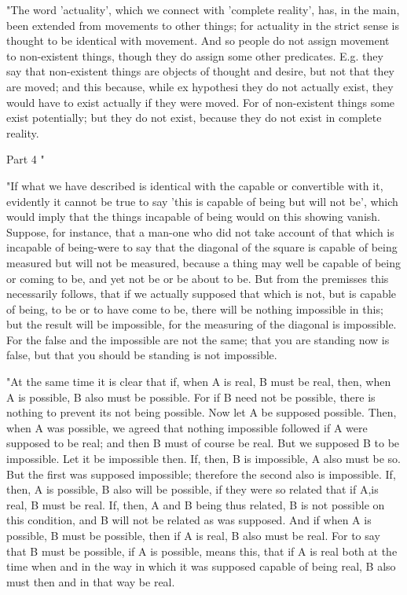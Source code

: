 "The word 'actuality', which we connect with 'complete reality', has,
in the main, been extended from movements to other things; for actuality
in the strict sense is thought to be identical with movement. And
so people do not assign movement to non-existent things, though they
do assign some other predicates. E.g. they say that non-existent things
are objects of thought and desire, but not that they are moved; and
this because, while ex hypothesi they do not actually exist, they
would have to exist actually if they were moved. For of non-existent
things some exist potentially; but they do not exist, because they
do not exist in complete reality. 

Part 4 "

"If what we have described is identical with the capable or convertible
with it, evidently it cannot be true to say 'this is capable of being
but will not be', which would imply that the things incapable of being
would on this showing vanish. Suppose, for instance, that a man-one
who did not take account of that which is incapable of being-were
to say that the diagonal of the square is capable of being measured
but will not be measured, because a thing may well be capable of being
or coming to be, and yet not be or be about to be. But from the premisses
this necessarily follows, that if we actually supposed that which
is not, but is capable of being, to be or to have come to be, there
will be nothing impossible in this; but the result will be impossible,
for the measuring of the diagonal is impossible. For the false and
the impossible are not the same; that you are standing now is false,
but that you should be standing is not impossible. 

"At the same time it is clear that if, when A is real, B must be real,
then, when A is possible, B also must be possible. For if B need not
be possible, there is nothing to prevent its not being possible. Now
let A be supposed possible. Then, when A was possible, we agreed that
nothing impossible followed if A were supposed to be real; and then
B must of course be real. But we supposed B to be impossible. Let
it be impossible then. If, then, B is impossible, A also must be so.
But the first was supposed impossible; therefore the second also is
impossible. If, then, A is possible, B also will be possible, if they
were so related that if A,is real, B must be real. If, then, A and
B being thus related, B is not possible on this condition, and B will
not be related as was supposed. And if when A is possible, B must
be possible, then if A is real, B also must be real. For to say that
B must be possible, if A is possible, means this, that if A is real
both at the time when and in the way in which it was supposed capable
of being real, B also must then and in that way be real.

